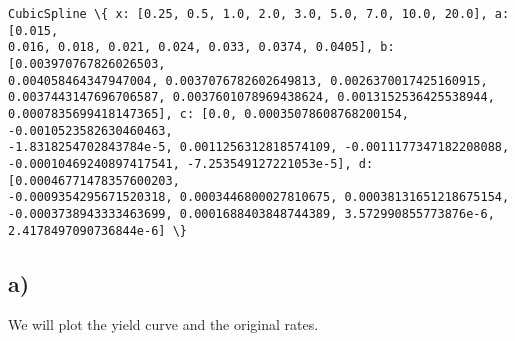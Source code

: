 \documentclass[11pt]{article}
\makeatletter
\newcommand{\boxspacing}{\kern\kvtcb@left@rule\kern\kvtcb@boxsep}
\newcommand{\prompt}[4]{
        {\ttfamily\llap{{\color{#2}[#3]:\hspace{3pt}#4}}\vspace{-\baselineskip}}
    }
\makeatother
\begin{document}
            \begin{tcolorbox}[breakable, size=fbox, boxrule=.5pt, pad at break*=1mm, opacityfill=0]
\prompt{Out}{outcolor}{ }{\boxspacing}
\begin{Verbatim}[commandchars=\\\{\}]
CubicSpline \{ x: [0.25, 0.5, 1.0, 2.0, 3.0, 5.0, 7.0, 10.0, 20.0], a: [0.015,
0.016, 0.018, 0.021, 0.024, 0.033, 0.0374, 0.0405], b: [0.003970767826026503,
0.004058464347947004, 0.0037076782602649813, 0.0026370017425160915,
0.0037443147696706587, 0.0037601078969438624, 0.0013152536425538944,
0.0007835699418147365], c: [0.0, 0.00035078608768200154, -0.0010523582630460463,
-1.8318254702843784e-5, 0.0011256312818574109, -0.0011177347182208088,
-0.00010469240897417541, -7.253549127221053e-5], d: [0.00046771478357600203,
-0.0009354295671520318, 0.0003446800027810675, 0.00038131651218675154,
-0.0003738943333463699, 0.0001688403848744389, 3.572990855773876e-6,
2.4178497090736844e-6] \}
\end{Verbatim}
\end{tcolorbox}
        
    \subsection{a)}\label{a}

    We will plot the yield curve and the original rates.
\end{document}

